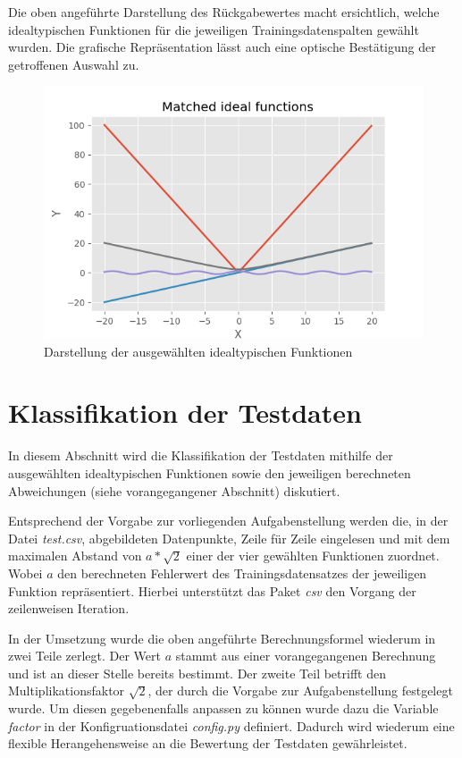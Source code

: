 Die oben angeführte Darstellung des Rückgabewertes macht ersichtlich, welche idealtypischen Funktionen für die jeweiligen Trainingsdatenspalten gewählt wurden. Die grafische Repräsentation lässt auch eine optische Bestätigung der getroffenen Auswahl zu.

\begin{figure}[h]
\centering
\includegraphics[width=13cm]{../output/figures/ideal.png}
\caption{Darstellung der ausgewählten idealtypischen Funktionen}
\label{fig:ideal}
\end{figure}

\section{Klassifikation der Testdaten}

In diesem Abschnitt wird die Klassifikation der Testdaten mithilfe der ausgewählten idealtypischen Funktionen sowie den jeweiligen berechneten Abweichungen (siehe vorangegangener Abschnitt) diskutiert.

Entsprechend der Vorgabe zur vorliegenden Aufgabenstellung werden die, in der Datei \emph{test.csv}, abgebildeten Datenpunkte, Zeile für Zeile eingelesen und mit dem maximalen Abstand von $ a*\sqrt{2}$ einer der vier gewählten Funktionen zuordnet. Wobei $a$ den berechneten Fehlerwert des Trainingsdatensatzes der jeweiligen Funktion repräsentiert. Hierbei unterstützt das Paket \emph{csv} den Vorgang der zeilenweisen Iteration. \citep{python_software_foundation_csv_nodate-1}

In der Umsetzung wurde die oben angeführte Berechnungsformel wiederum in zwei Teile zerlegt. Der Wert $a$ stammt aus einer vorangegangenen Berechnung und ist an dieser Stelle bereits bestimmt. Der zweite Teil betrifft den Multiplikationsfaktor $\sqrt{2}$, der durch die Vorgabe zur Aufgabenstellung festgelegt wurde. Um diesen gegebenenfalls anpassen zu können wurde dazu die Variable \emph{factor} in der Konfigruationsdatei \emph{config.py} definiert. Dadurch wird wiederum eine flexible Herangehensweise an die Bewertung der Testdaten gewährleistet.

